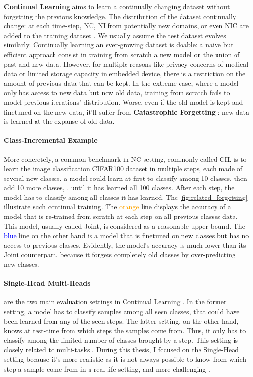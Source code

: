 \textbf{Continual Learning} aims to learn a continually changing dataset without forgetting the
previous knowledge. The distribution of the dataset continually change: at each time-step, \ac{NC},
\ac{NI} from potentially new domains, or even \ac{NIC} are added to the training dataset
\cite{lomonaco2017core50}. We usually assume the test dataset evolves similarly. Continually
learning an ever-growing dataset is doable: a naive but efficient approach consist in training from
scratch a new model on the union of past and new data. However, for multiple reasons like privacy
concerns of medical data or limited storage capacity in embedded device, there is a restriction on
the amount of previous data that can be kept. In the extreme case, where a model only has access to
new data but now old data, training from scratch fails to model previous iterations' distribution.
Worse, even if the old model is kept and finetuned on the new data, it'll suffer from
\textbf{Catastrophic Forgetting} \citep{robins1995catastrophicforgetting}: new data is learned at
the expanse of old data.

\paragraph{Class-Incremental Example} More concretely, a common benchmark in \ac{NC} setting,
commonly called \ac{CIL} is to learn the image classification CIFAR100 dataset
\citep{krizhevskycifar100} in multiple steps, each made of several new classes. \eg a model could
learn at first to classify among 10 classes, then add 10 more classes, \etc. until it has learned
all 100 classes. After each step, the model has to classify among all classes it has learned. The
\autoref{fig:related_forgetting} illustrate such continual training. The \textcolor{orange}{orange}
line displays the accuracy of a model that is re-trained from scratch at each step on all previous
classes data. This model, usually called Joint, is considered as a reasonable upper bound. The
\textcolor{blue}{blue} line on the other hand is a model that is finetuned on new classes but has no
access to previous classes. Evidently, the model's accuracy is much lower than its Joint
counterpart, because it forgets completely old classes by over-predicting new classes.


\paragraph{Single-Head \vs Multi-Heads} are the two main evaluation settings in Continual Learning
. In the former setting, a model has to classify samples among all seen classes,
that could have been learned from any of the seen steps. The latter setting, on the other hand,
knows at test-time from which steps the samples come from. Thus, it only has to classify among the
limited number of classes brought by a step. This setting is closely related to multi-tasks
. During this thesis, I focused on the Single-Head setting because it's more realistic
as it is not always possible to know from which step a sample come from in a real-life setting, and
more challenging \citep{lesort2019regulshortcomings}.


